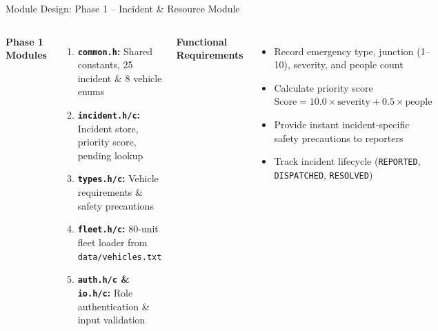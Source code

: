 \documentclass[aspectratio=169,11pt]{beamer}
\begin{document}
\begin{frame}{Module Design: Phase 1 -- Incident \& Resource Module}
\footnotesize
\begin{columns}[T,totalwidth=\textwidth]
\textbf{\normalsize\color{GEUBlue}Phase 1 Modules}
\begin{enumerate}\itemsep2pt
\item \textbf{\texttt{common.h}:} Shared constants, 25 incident \& 8 vehicle enums
\item \textbf{\texttt{incident.h/c}:} Incident store, priority score, pending lookup
\item \textbf{\texttt{types.h/c}:} Vehicle requirements \& safety precautions
\item \textbf{\texttt{fleet.h/c}:} 80-unit fleet loader from \texttt{data/vehicles.txt}
\item \textbf{\texttt{auth.h/c} \& \texttt{io.h/c}:} Role authentication \& input validation
\end{enumerate}
\textbf{\normalsize\color{GEUBlue}Functional Requirements}
\begin{itemize}\itemsep2pt
\item Record emergency type, junction (1--10), severity, and people count
\item Calculate priority score $\text{Score} = 10.0 \times \text{severity} + 0.5 \times \text{people}$
\item Provide instant incident-specific safety precautions to reporters
\item Track incident lifecycle (\texttt{REPORTED}, \texttt{DISPATCHED}, \texttt{RESOLVED})
\end{itemize}
\end{columns}
\end{frame}
\end{document}
